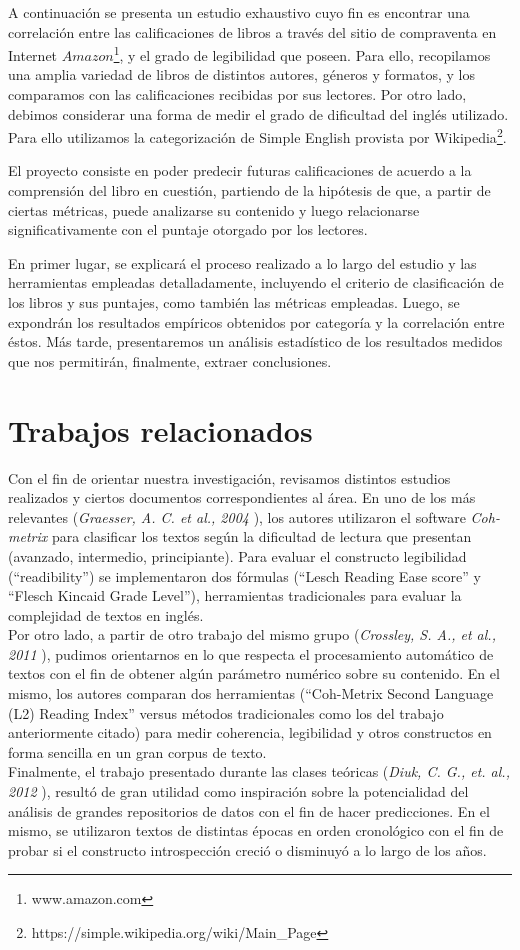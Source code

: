 \documentclass[12pt,journal,compsoc]{IEEEtran}
\begin{document}
A continuación se presenta un estudio exhaustivo cuyo fin es encontrar una correlación entre las calificaciones de libros a través del sitio de compraventa en Internet $Amazon$\footnote{www.amazon.com}, y el grado de legibilidad que poseen. Para ello, recopilamos una amplia variedad de libros de distintos autores, géneros y formatos, y los comparamos con las calificaciones recibidas por sus lectores. Por otro lado, debimos considerar una forma de medir el grado de dificultad del inglés utilizado. Para ello utilizamos la categorización de Simple English provista por Wikipedia\footnote{https://simple.wikipedia.org/wiki/Main\_Page}.

El proyecto consiste en poder predecir futuras calificaciones de acuerdo a la comprensión del libro en cuestión, partiendo de la hipótesis de que, a partir de ciertas métricas, puede analizarse su contenido y luego relacionarse significativamente con el puntaje otorgado por los lectores.

En primer lugar, se explicará el proceso realizado a lo largo del estudio y las herramientas empleadas detalladamente, incluyendo el criterio de clasificación de los libros y sus puntajes, como también las métricas empleadas. Luego, se expondrán los resultados empíricos obtenidos por categoría y la correlación entre éstos. Más tarde, presentaremos un análisis estadístico de los resultados medidos que nos permitirán, finalmente, extraer conclusiones.

\section{Trabajos relacionados}
Con el fin de orientar nuestra investigación, revisamos distintos estudios realizados y ciertos documentos correspondientes al área. En uno de los más relevantes (\textit{Graesser, A. C. et al., 2004} \cite{graesser}), los autores utilizaron el software \textit{Coh-metrix} para clasificar los textos según la dificultad de lectura que presentan (avanzado, intermedio, principiante). Para evaluar el constructo legibilidad (``readibility'') se implementaron dos fórmulas (``Lesch Reading Ease score'' y ``Flesch Kincaid Grade Level''), herramientas tradicionales para evaluar la complejidad de textos en inglés.\\
Por otro lado, a partir de otro trabajo del mismo grupo (\textit{Crossley, S. A., et al., 2011} \cite{crossley}), pudimos orientarnos en lo que respecta el procesamiento automático de textos con el fin de obtener algún parámetro numérico sobre su contenido. En el mismo, los autores comparan dos herramientas (``Coh-Metrix Second Language (L2) Reading Index'' versus métodos tradicionales como los del trabajo anteriormente citado) para medir coherencia, legibilidad y otros constructos en forma sencilla en un gran corpus de texto.\\
Finalmente, el trabajo presentado durante las clases teóricas (\textit{Diuk, C. G., et. al., 2012} \cite{diuk}), resultó de gran utilidad como inspiración sobre la potencialidad del análisis de grandes repositorios de datos con el fin de hacer predicciones. En el mismo, se utilizaron  textos de distintas épocas en orden cronológico con el fin de probar si el constructo introspección creció o disminuyó a lo largo de los años.
\end{document}
